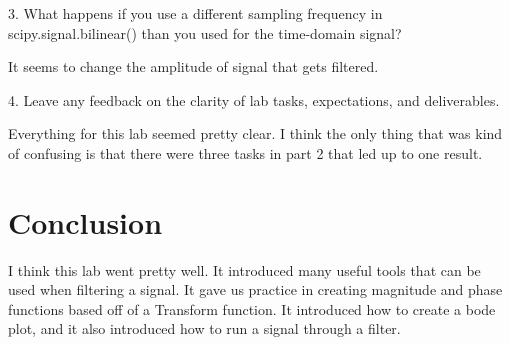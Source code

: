 \documentclass[12pt]{report}
\begin{document}
3. What happens if you use a different sampling frequency in
scipy.signal.bilinear() than you used for the time-domain signal?

It seems to change the amplitude of signal that gets filtered.

4. Leave any feedback on the clarity of lab tasks, expectations, and
deliverables.

Everything for this lab seemed pretty clear. I think the only thing
that was kind of confusing is that there were three tasks in part 2
that led up to one result.

\section{Conclusion}
I think this lab went pretty well. It introduced many useful tools
that can be used when filtering a signal. It gave us practice in creating
magnitude and phase functions based off of a Transform function. It 
introduced how to create a bode plot, and it also introduced how to run a 
signal through a filter. 
\end{document}

